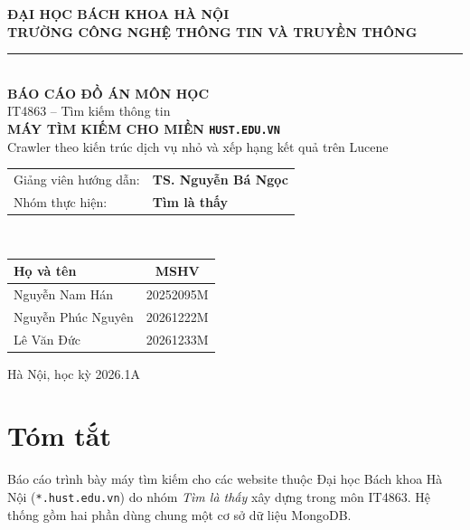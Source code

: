 \documentclass[12pt,a4paper]{report}
\begin{document}
\hypersetup{pageanchor=false}
\begin{titlepage}
\centering
{\large\bfseries ĐẠI HỌC BÁCH KHOA HÀ NỘI}\\[2pt]
{\large\bfseries TRƯỜNG CÔNG NGHỆ THÔNG TIN VÀ TRUYỀN THÔNG}\\[2pt]
\rule{0.5\textwidth}{0.6pt}\\[2.6cm]

{\Large\bfseries BÁO CÁO ĐỒ ÁN MÔN HỌC}\\[8pt]
{\large IT4863 -- Tìm kiếm thông tin}\\[1.6cm]

{\LARGE\bfseries MÁY TÌM KIẾM CHO MIỀN \texttt{HUST.EDU.VN}}\\[10pt]
{\large Crawler theo kiến trúc dịch vụ nhỏ và xếp hạng kết quả trên Lucene}\\[2cm]

\begin{tabular}{@{}ll@{}}
Giảng viên hướng dẫn: & \textbf{TS. Nguyễn Bá Ngọc} \\
Nhóm thực hiện: & \textbf{Tìm là thấy}
\end{tabular}\\[14pt]

\begin{tabular}{lc}
\toprule
Họ và tên & MSHV \\
\midrule
Nguyễn Nam Hán & 20252095M \\
Nguyễn Phúc Nguyên & 20261222M \\
Lê Văn Đức & 20261233M \\
\bottomrule
\end{tabular}

\vfill
{\large Hà Nội, học kỳ 2026.1A}
\end{titlepage}
\hypersetup{pageanchor=true}

\chapter*{Tóm tắt}

Báo cáo trình bày máy tìm kiếm cho các website thuộc Đại học Bách khoa Hà Nội (\texttt{*.hust.edu.vn}) do nhóm
\emph{Tìm là thấy} xây dựng trong môn IT4863. Hệ thống gồm hai phần dùng chung một cơ sở dữ liệu MongoDB.
\end{document}
